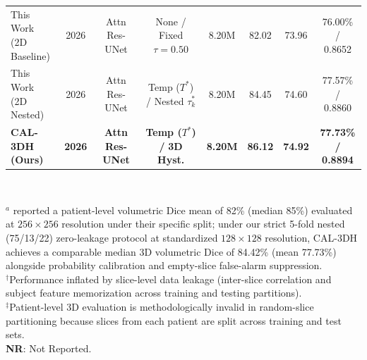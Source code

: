 \documentclass[preprint,12pt,authoryear]{elsarticle}
\begin{document}
\begin{table}[tbp]
\begin{tabular*}{\textwidth}{@{\extracolsep{\fill}}lccccccc}
\shortstack[l]{This Work \\ (2D Baseline)} & 2026 & Attn Res-UNet & None / Fixed $\tau=0.50$ & 8.20M & 82.02 & 73.96 & \shortstack{76.00\% / \\ 0.8652} \\
\shortstack[l]{This Work \\ (2D Nested)} & 2026 & Attn Res-UNet & \shortstack{Temp ($T^*$) / \\ Nested $\tau_k^*$} & 8.20M & 84.45 & 74.60 & \shortstack{77.57\% / \\ 0.8860} \\
\shortstack[l]{\textbf{CAL-3DH} \\ \textbf{(Ours)}} & \textbf{2026} & \textbf{Attn Res-UNet} & \shortstack{\textbf{Temp ($T^*$) /} \\ \textbf{3D Hyst.}} & \textbf{8.20M} & \textbf{86.12} & \textbf{74.92} & \shortstack{\textbf{77.73\% /} \\ \textbf{0.8894}} \\
\bottomrule
\end{tabular*}
\\[4pt]
\begin{minipage}{\textwidth}
\scriptsize
$^a$\citet{buda2019association} reported a patient-level volumetric Dice mean of 82\% (median 85\%) evaluated at $256 \times 256$ resolution under their specific split; under our strict 5-fold nested (75/13/22) zero-leakage protocol at standardized $128 \times 128$ resolution, CAL-3DH achieves a comparable median 3D volumetric Dice of 84.42\% (mean 77.73\%) alongside probability calibration and empty-slice false-alarm suppression.\\[2pt]
$^\dagger$Performance inflated by slice-level data leakage (inter-slice correlation and subject feature memorization across training and testing partitions).\\[2pt]
$^\ddagger$Patient-level 3D evaluation is methodologically invalid in random-slice partitioning because slices from each patient are split across training and test sets.\\[2pt]
\textbf{NR}: Not Reported.
\end{minipage}
\end{table}
\end{document}
